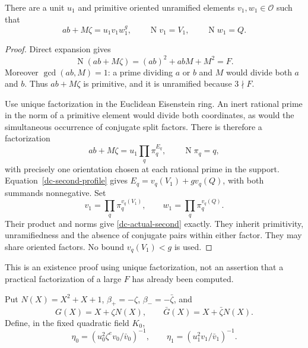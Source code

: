 \begin{lemma}\label{dc-second-lift}
There are a unit $u_1$ and primitive oriented unramified elements
$v_1,w_1\in\mathcal O$ such that
\begin{equation}\label{dc-actual-second}
 ab+M\zeta=u_1v_1w_1^g,\qquad
 \operatorname N v_1=V_1,\qquad\operatorname N w_1=Q.
\end{equation}
\end{lemma}
\begin{proof}
Direct expansion gives
\begin{equation}\label{dc-second-norm-identity}
 \operatorname N(ab+M\zeta)=(ab)^2+abM+M^2=F.
\end{equation}
Moreover $\gcd(ab,M)=1$: a prime dividing $a$ or $b$ and $M$
would divide both $a$ and $b$. Thus $ab+M\zeta$ is primitive,
and it is unramified because $3\nmid F$.

Use unique factorization in the Euclidean Eisenstein ring. An inert
rational prime in the norm of a primitive element would divide both
coordinates, as would the simultaneous occurrence of conjugate split
factors. There is therefore a factorization
\[
 ab+M\zeta=u_1\prod_q\pi_q^{E_q},\qquad
 \operatorname N\pi_q=q,
\]
with precisely one orientation chosen at each rational prime in the
support. Equation~\eqref{dc-second-profile} gives
$E_q=v_q(V_1)+g v_q(Q)$, with both summands nonnegative. Set
\[
 v_1=\prod_q\pi_q^{v_q(V_1)},\qquad
 w_1=\prod_q\pi_q^{v_q(Q)}.
\]
Their product and norms give \eqref{dc-actual-second} exactly.
They inherit primitivity, unramifiedness and the absence of
conjugate pairs within either factor. They may share oriented
factors. No bound $v_q(V_1)<g$ is used.
\end{proof}

This is an existence proof using unique factorization, not an assertion
that a practical factorization of a large $F$ has already been computed.

Put $N(X)=X^2+X+1$, $\beta_+=-\zeta$, $\beta_-=-\bar\zeta$,
and
\begin{equation}\label{dc-quadratics}
 G(X)=X+\zeta N(X),\qquad
 \bar G(X)=X+\bar\zeta N(X).
\end{equation}
Define, in the fixed quadratic field $K_0$,
\begin{equation}\label{dc-coefficients}
 \eta_0=(u_0^2\zeta^e v_0/\bar v_0)^{-1},\qquad
 \eta_1=(u_1^2v_1/\bar v_1)^{-1}.
\end{equation}

